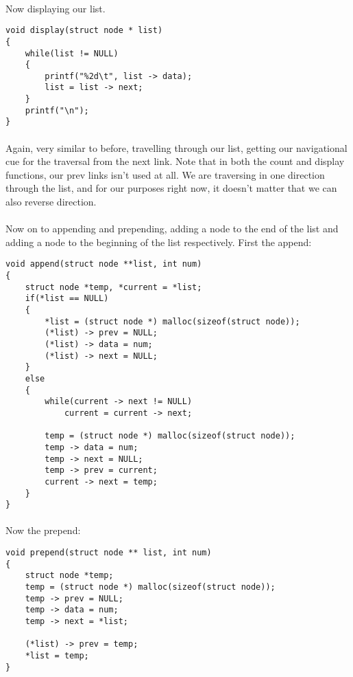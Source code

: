 \documentclass[10pt, a4paper, twosize]{article}
\begin{document}
\paragraph{} Now displaying our list.
\begin{lstlisting}
void display(struct node * list)
{
    while(list != NULL)
    {
        printf("%2d\t", list -> data);
        list = list -> next;
    }
    printf("\n");
}
\end{lstlisting}
\paragraph{} Again, very similar to before, travelling through our list, getting our navigational cue for the traversal from the next link. Note that in both the count and display functions, our prev links isn't used at all. We are traversing in one direction through the list, and for our purposes right now, it doesn't matter that we can also reverse direction.

\paragraph{} Now on to appending and prepending, adding a node to the end of the list and adding a node to the beginning of the list respectively. First the append:
\begin{lstlisting}
void append(struct node **list, int num)
{
    struct node *temp, *current = *list;
    if(*list == NULL)
    {
        *list = (struct node *) malloc(sizeof(struct node));
        (*list) -> prev = NULL;
        (*list) -> data = num;
        (*list) -> next = NULL;
    }
    else
    {
        while(current -> next != NULL)
            current = current -> next;
            
        temp = (struct node *) malloc(sizeof(struct node));
        temp -> data = num;
        temp -> next = NULL;
        temp -> prev = current;
        current -> next = temp;
    }
}
\end{lstlisting}
\paragraph{} 

\paragraph{} Now the prepend:
\begin{lstlisting}
void prepend(struct node ** list, int num)
{
    struct node *temp;
    temp = (struct node *) malloc(sizeof(struct node));
    temp -> prev = NULL;
    temp -> data = num;
    temp -> next = *list;

    (*list) -> prev = temp;
    *list = temp;
}
\end{lstlisting}
\end{document}
